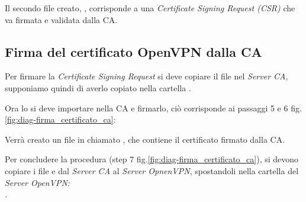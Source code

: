 Il secondo file creato, , corrisponde a una \textit{Certificate Signing Request (CSR)} che va firmata e validata dalla CA. 

\subsection{Firma del certificato OpenVPN dalla CA \ok} %
\label{subsec:sign_openvpn}

Per firmare la \textit{Certificate Signing Request} si deve copiare il file  nel \textit{Server CA}, supponiamo quindi di averlo copiato nella cartella .

Ora lo si deve importare nella CA e firmarlo, ciò corrisponde ai passaggi 5 e 6 fig.\ref{fig:diag-firma_certificato_ca}:


Verrà creato un file in  chiamato , che contiene il certificato firmato dalla CA.

Per concludere la procedura (step 7 fig.\ref{fig:diag-firma_certificato_ca}), si devono copiare i file  e  dal \textit{Server CA} al \textit{Server OpnenVPN}, spostandoli nella cartella del \it{Server OpenVPN}: \\.

